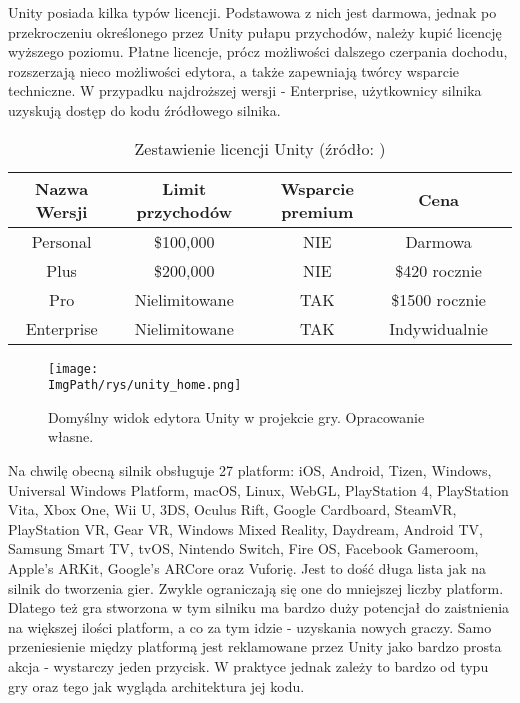 \documentclass[a4paper,12pt,twoside,openany]{report}
\newcommand{\ImgPath}{.}
\begin{document}
Unity posiada kilka typów licencji. Podstawowa z nich jest darmowa, jednak po przekroczeniu określonego przez Unity pułapu przychodów, należy kupić licencję wyższego poziomu. Płatne licencje, prócz możliwości dalszego czerpania dochodu, rozszerzają nieco możliwości edytora, a także zapewniają twórcy wsparcie techniczne. W przypadku najdroższej wersji - Enterprise, użytkownicy silnika uzyskują dostęp do kodu źródłowego silnika.

\begin{table}[h!]
\centering
\begin{tabular}{c|cccc}
Nazwa Wersji & Limit przychodów & Wsparcie premium & Cena \\ \hline
Personal & \$100,000 & NIE & Darmowa \\
Plus & \$200,000 & NIE & \$420 rocznie \\
Pro & Nielimitowane & TAK & \$1500 rocznie \\
Enterprise & Nielimitowane & TAK & Indywidualnie \\
\end{tabular}
\caption{Zestawienie licencji Unity (źródło: \cite{unity_wiki})}
\label{table_unity_versions}
\end{table}

\begin{figure}[!htbp]
	\begin{center}
\centering
\texttt{[image: \\ImgPath/rys/unity\_home.png]}
\end{center}
	\caption{Domyślny widok edytora Unity w projekcie gry. Opracowanie własne.}
	\label{unity_home}
\end{figure}

Na chwilę obecną silnik obsługuje 27 platform: iOS, Android, Tizen, Windows, Universal Windows Platform, macOS, Linux, WebGL, PlayStation 4, PlayStation Vita, Xbox One, Wii U, 3DS, Oculus Rift, Google Cardboard, SteamVR, PlayStation VR, Gear VR, Windows Mixed Reality, Daydream, Android TV, Samsung Smart TV, tvOS, Nintendo Switch, Fire OS, Facebook Gameroom, Apple's ARKit, Google's ARCore oraz Vuforię. Jest to dość długa lista jak na silnik do tworzenia gier. Zwykle ograniczają się one do mniejszej liczby platform. Dlatego też gra stworzona w tym silniku ma bardzo duży potencjał do zaistnienia na większej ilości platform, a co za tym idzie - uzyskania nowych graczy. Samo przeniesienie między platformą jest reklamowane przez Unity jako bardzo prosta akcja - wystarczy jeden przycisk. W praktyce jednak zależy to bardzo od typu gry oraz tego jak wygląda architektura jej kodu.
\end{document}
